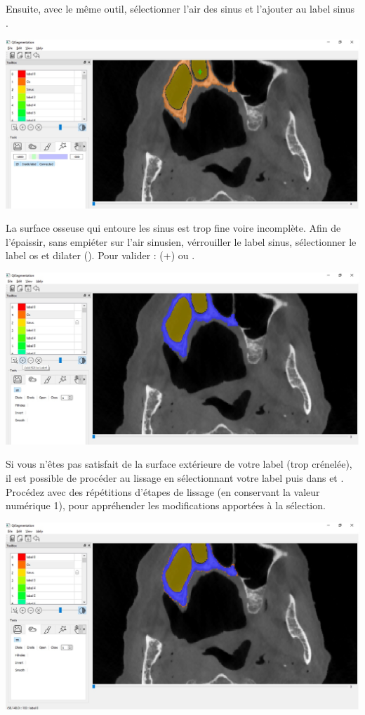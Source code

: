 \documentclass {article}
\begin{document}
Ensuite, avec le même outil, sélectionner l'air des sinus et l'ajouter au label \og sinus \fg .

\begin{center}
\includegraphics[scale=0.5]{Iconographie/Exemple_2_2.jpg}
\end{center}

La surface osseuse qui entoure les sinus est trop fine voire incomplète. Afin de l'épaissir, sans empiéter sur l'air sinusien, vérrouiller le label sinus, sélectionner le label os et dilater (). Pour valider : (+) ou .

\begin{center}
\includegraphics[scale=0.5]{Iconographie/Exemple_2_3.jpg}
\end{center}

Si vous n'êtes pas satisfait de la surface extérieure de votre label (trop crénelée), il est possible de procéder au lissage en sélectionnant votre label puis dans  et . Procédez avec des répétitions d'étapes de lissage (en conservant la valeur numérique 1), pour appréhender les modifications apportées à la sélection.

\begin{center}
\includegraphics[scale=0.5]{Iconographie/Exemple_2_4.jpg}
\end{center}
\end{document}
